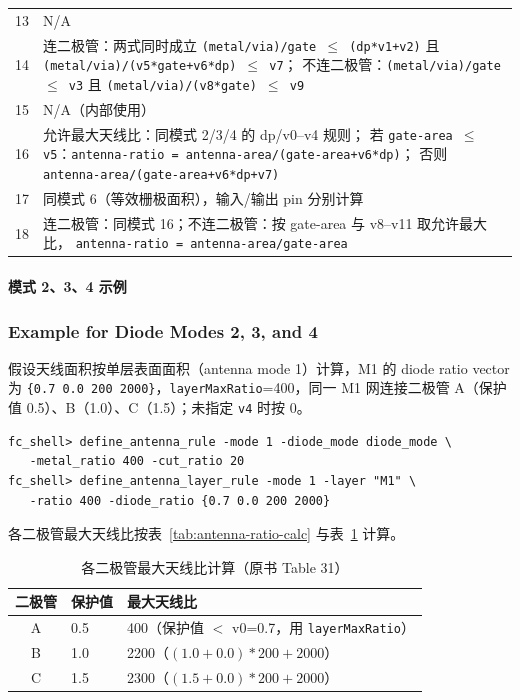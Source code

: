 \begin{table}[htbp]
\begin{tabularx}{\textwidth}{@{}c >{\raggedright\arraybackslash}X@{}}
13 & N/A \\
14 & 连二极管：两式同时成立\newline
\texttt{(metal/via)/gate $\leq$ (dp*v1+v2)} 且
\texttt{(metal/via)/(v5*gate+v6*dp) $\leq$ v7}；\newline
不连二极管：\texttt{(metal/via)/gate $\leq$ v3} 且
\texttt{(metal/via)/(v8*gate) $\leq$ v9} \\
15 & N/A（内部使用） \\
16 & 允许最大天线比：同模式 2/3/4 的 dp/v0--v4 规则；\newline
若 \texttt{gate-area $\leq$ v5}：\texttt{antenna-ratio = antenna-area/(gate-area+v6*dp)}；\newline
否则 \texttt{antenna-area/(gate-area+v6*dp+v7)} \\
17 & 同模式 6（等效栅极面积），输入/输出 pin 分别计算 \\
18 & 连二极管：同模式 16；不连二极管：按 gate-area 与 v8--v11 取允许最大比，\newline
\texttt{antenna-ratio = antenna-area/gate-area} \\
\bottomrule
\end{tabularx}
\end{table}

\paragraph{模式 2、3、4 示例}
\subsubsection*{Example for Diode Modes 2, 3, and 4}

假设天线面积按单层表面面积（antenna mode 1）计算，M1 的 diode ratio vector 为 \texttt{\{0.7 0.0 200 2000\}}，\texttt{layerMaxRatio}=400，同一 M1 网连接二极管 A（保护值 0.5）、B（1.0）、C（1.5）；未指定 \texttt{v4} 时按 0。

\begin{lstlisting}
fc_shell> define_antenna_rule -mode 1 -diode_mode diode_mode \
   -metal_ratio 400 -cut_ratio 20
fc_shell> define_antenna_layer_rule -mode 1 -layer "M1" \
   -ratio 400 -diode_ratio {0.7 0.0 200 2000}
\end{lstlisting}

各二极管最大天线比按表~\ref{tab:antenna-ratio-calc} 与表~\ref{tab:max-ratio-per-diode} 计算。

\begin{table}[htbp]
\centering
\caption{各二极管最大天线比计算（原书 Table 31）}
\label{tab:max-ratio-per-diode}
\begin{tabular}{@{}clp{}@{}}
\toprule
二极管 & 保护值 & 最大天线比 \\
\midrule
A & 0.5 & 400（保护值 $<$ v0=0.7，用 \texttt{layerMaxRatio}） \\
B & 1.0 & 2200（$(1.0+0.0)*200+2000$） \\
C & 1.5 & 2300（$(1.5+0.0)*200+2000$） \\
\bottomrule
\end{tabular}
\end{table}

